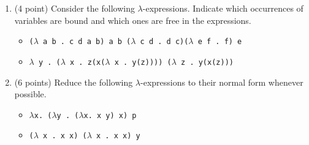 
\begin{enumerate}
\item (4 point) Consider the following $\lambda$-expressions. Indicate which occurrences of
variables are bound and which ones are free in the expressions.

\begin{itemize}
    \item \texttt{($\lambda$ a b .~c d a b) a b ($\lambda$ c d .~d c)($\lambda$ e f .~f) e}
    \vspace{2cm}
    
    \item \texttt{$\lambda$ y .~($\lambda$ x .~z(x($\lambda$ x .~y(z)))) ($\lambda$ z .~y(x(z)))}
    \vspace{2cm}
\end{itemize}








\item (6 points) Reduce the following $\lambda$-expressions to their normal form whenever possible. 


\begin{itemize}
    \item \texttt{$\lambda$x. ($\lambda$y . ($\lambda$x. x y) x) p}
    \vspace{3cm}
    
    \item \texttt{($\lambda$ x . x x) ($\lambda$ x . x x) y}
    \vspace{3cm}
\end{itemize}






\end{enumerate}

